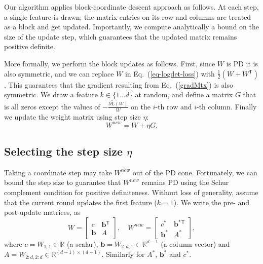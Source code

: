 \documentclass{article} %
\newcommand\mat[1]{{#1}}
\renewcommand\vec[1]{\mathbf{#1}}
\newcommand{\T}{{}^\mathsf{T}}
\newcommand{\W}{\mat{W}}
\newcommand{\newW}{{\mat{W^{new}}}}
\newcommand{\R}{\mathbb{R}}
\newcommand{\tL}{\tilde{L}(\W)}
\newcommand{\B}{\vec{b}}
\newcommand{\C}{c}
\newcommand{\grd}{\frac{\partial \tL}{\W}}
\newcommand{\Wvec}{\W_{2:d,1}}
\newcommand{\Wscalar}{\W_{1,1}}
\renewcommand{\eqref}[1]{Eq.~(\ref{#1})}
\begin{document}
Our algorithm applies block-coordinate descent approach as follows. At each step, a single feature is drawn; the matrix entries on its row and columns are treated as a block and get updated. Importantly, we compute analytically a bound on the size of the update step, which guarantees that the updated matrix remains positive definite.

More formally, we perform the block updates as follows. First, since $\W$ is PD it is also symmetric, and we can replace $\W$ in \eqref{eq-logdet-loss} with $\tfrac{1}{2}(\W + \W\T)$. This guarantees that the gradient resulting from \eqref{gradMtx} is also symmetric. We draw a feature $k \in \{1 \ldots d$\} at random, and define a matrix $G$ that is all zeros except the values of $-\grd$ on the $i$-th row and $i$-th column. Finally we update the weight matrix using step size $\eta$:
\begin{equation}
    \newW = \W +\eta G.
\label{updateEq}
\end{equation}
\subsection{Selecting the step size $\eta$}\label{subsec:step}
Taking a coordinate step may take $\newW$ out of the PD cone. Fortunately, we can bound the step size to guarantee that $\newW$ remains PD using the Schur complement condition for positive definiteness. Without loss of generality, assume that the current round updates the first feature ($k = 1$). We write the pre- and post-update
matrices, as
\begin{equation}
  \W = \left[ \begin{matrix} \C & \B\T \\ \B & A \end{matrix} \right],
  \quad
  \newW = \left[ \begin{matrix} \C^* & \B^*\T \\ \B^* & A^* \end{matrix} \right],
  \label{schurNotationPreUpdate}
\end{equation}
 where $\C = \Wscalar \in \R$ (a scalar), $\B = \Wvec \in
\R^{d-1}$ (a column vector) and $A = \W_{2:d,2:d} \in \R^{(d-1)
\times (d-1)}$. Similarly for $A^*$, $\B^*$ and $\C^*$.
\end{document}
